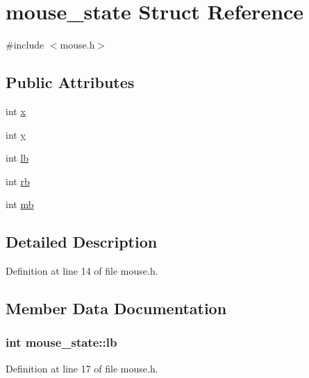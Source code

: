 \hypertarget{structmouse__state}{}\section{mouse\+\_\+state Struct Reference}
\label{structmouse__state}


{\ttfamily \#include $<$mouse.\+h$>$}

\subsection*{Public Attributes}
\begin{DoxyCompactItemize}
\item 
int \hyperlink{structmouse__state_aa964e4da16544052d8ba173fd4a9ca5b}{x}
\item 
int \hyperlink{structmouse__state_a10f99b74dfdd2c8d919f3f4810b4dc68}{y}
\item 
int \hyperlink{structmouse__state_af728099558724d8f6a1518f4be3aacc2}{lb}
\item 
int \hyperlink{structmouse__state_aa857cd8e3060ae6155a4bbae6d01373e}{rb}
\item 
int \hyperlink{structmouse__state_af932ead4d69854660dbc4b63917458ee}{mb}
\end{DoxyCompactItemize}


\subsection{Detailed Description}


Definition at line 14 of file mouse.\+h.



\subsection{Member Data Documentation}
\hypertarget{structmouse__state_af728099558724d8f6a1518f4be3aacc2}{}
\subsubsection[{lb}]{\setlength{\rightskip}{0pt plus 5cm}int mouse\+\_\+state\+::lb}\label{structmouse__state_af728099558724d8f6a1518f4be3aacc2}


Definition at line 17 of file mouse.\+h.

\hypertarget{structmouse__state_af932ead4d69854660dbc4b63917458ee}{}
